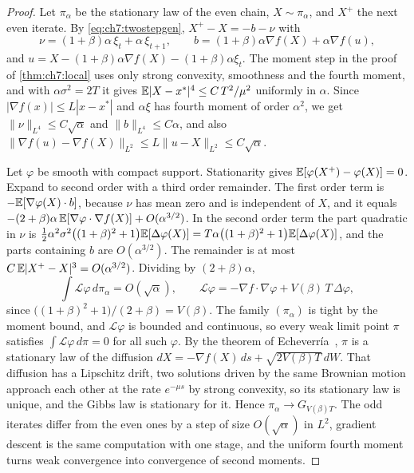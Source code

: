 \begin{proof}
Let $\pi_\alpha$ be the stationary law of the even chain, $X\sim\pi_\alpha$, and $X^+$ the next even iterate. By \eqref{eq:ch7:twostepgen}, $X^+-X=-b-\nu$ with
\[
  \nu=(1+\beta)\alpha\,\xi_t+\alpha\,\xi_{t+1},\qquad b=(1+\beta)\alpha\nabla f(X)+\alpha\nabla f(u),
\]
and $u=X-(1+\beta)\alpha\nabla f(X)-(1+\beta)\alpha\xi_t$. The moment step in the proof of \cref{thm:ch7:local} uses only strong convexity, smoothness and the fourth moment, and with $\alpha\sigma^2=2T$ it gives $\mathbb{E}|X-x^\ast|^4\le C\,T^2/\mu^2$ uniformly in $\alpha$. Since $|\nabla f(x)|\le L|x-x^\ast|$ and $\alpha\xi$ has fourth moment of order $\alpha^2$, we get $\|\nu\|_{L^4}\le C\sqrt\alpha$ and $\|b\|_{L^4}\le C\alpha$, and also $\|\nabla f(u)-\nabla f(X)\|_{L^2}\le L\|u-X\|_{L^2}\le C\sqrt\alpha$.

Let $\varphi$ be smooth with compact support. Stationarity gives $\mathbb{E}[\varphi(X^+)-\varphi(X)]=0$. Expand to second order with a third order remainder. The first order term is $-\mathbb{E}[\nabla\varphi(X)\cdot b]$, because $\nu$ has mean zero and is independent of $X$, and it equals $-(2+\beta)\alpha\,\mathbb{E}[\nabla\varphi\cdot\nabla f(X)]+O(\alpha^{3/2})$. In the second order term the part quadratic in $\nu$ is $\tfrac12\alpha^2\sigma^2\bigl((1+\beta)^2+1\bigr)\mathbb{E}[\Delta\varphi(X)]=T\alpha\bigl((1+\beta)^2+1\bigr)\mathbb{E}[\Delta\varphi(X)]$, and the parts containing $b$ are $O(\alpha^{3/2})$. The remainder is at most $C\,\mathbb{E}|X^+-X|^3=O(\alpha^{3/2})$. Dividing by $(2+\beta)\alpha$,
\[
  \int\mathcal L\varphi\,d\pi_\alpha=O(\sqrt\alpha),\qquad \mathcal L\varphi=-\nabla f\cdot\nabla\varphi+V(\beta)\,T\,\Delta\varphi ,
\]
since $\bigl((1+\beta)^2+1\bigr)/(2+\beta)=V(\beta)$. The family $(\pi_\alpha)$ is tight by the moment bound, and $\mathcal L\varphi$ is bounded and continuous, so every weak limit point $\pi$ satisfies $\int\mathcal L\varphi\,d\pi=0$ for all such $\varphi$. By the theorem of Echeverr\'ia~\cite[Theorem~4.9.17]{ethier1986}, $\pi$ is a stationary law of the diffusion $dX=-\nabla f(X)\,ds+\sqrt{2V(\beta)T}\,dW$. That diffusion has a Lipschitz drift, two solutions driven by the same Brownian motion approach each other at the rate $e^{-\mu s}$ by strong convexity, so its stationary law is unique, and the Gibbs law is stationary for it. Hence $\pi_\alpha\to G_{V(\beta)T}$. The odd iterates differ from the even ones by a step of size $O(\sqrt\alpha)$ in $L^2$, gradient descent is the same computation with one stage, and the uniform fourth moment turns weak convergence into convergence of second moments.
\end{proof}

